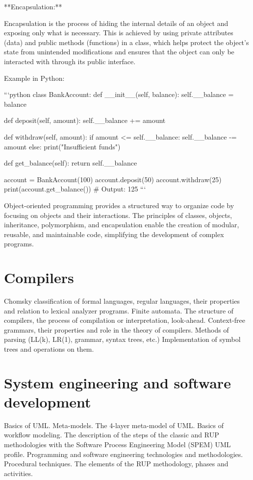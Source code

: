 \documentclass{article}
\begin{document}
**Encapsulation:**

Encapsulation is the process of hiding the internal details of an object and exposing only what is necessary. This is achieved by using private attributes (data) and public methods (functions) in a class, which helps protect the object's state from unintended modifications and ensures that the object can only be interacted with through its public interface.

Example in Python:

```python
class BankAccount:
    def __init__(self, balance):
        self.__balance = balance

    def deposit(self, amount):
        self.__balance += amount

    def withdraw(self, amount):
        if amount <= self.__balance:
            self.__balance -= amount
        else:
            print("Insufficient funds")

    def get_balance(self):
        return self.__balance

account = BankAccount(100)
account.deposit(50)
account.withdraw(25)
print(account.get_balance())  # Output: 125
```

Object-oriented programming provides a structured way to organize code by focusing on objects and their interactions. The principles of classes, objects, inheritance, polymorphism, and encapsulation enable the creation of modular, reusable, and maintainable code, simplifying the development of complex programs.


\section{Compilers}

Chomsky classification of formal languages, regular languages, their properties and relation to lexical analyzer programs. Finite automata. The structure of compilers, the process of compilation or interpretation, look-ahead. Context-free grammars, their properties and role in the theory of compilers. Methods of parsing (LL(k), LR(1), grammar, syntax trees, etc.) Implementation of symbol trees and operations on them.


\section{System engineering and software development}

Basics of UML. Meta-models. The 4-layer meta-model of UML. Basics of workflow modeling. The description of the steps of the classic and RUP methodologies with the Software Process Engineering Model (SPEM) UML profile. Programming and software engineering technologies and methodologies. Procedural techniques. The elements of the RUP methodology, phases and activities.
\end{document}
